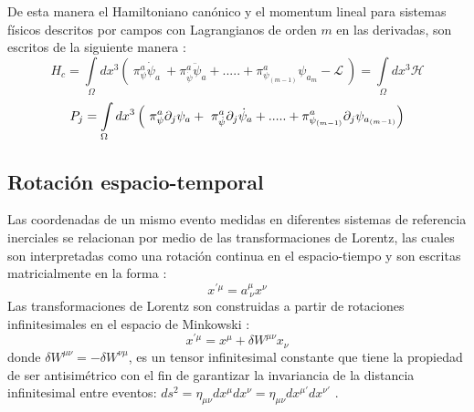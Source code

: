 \documentclass[a4paper,12pt]{article}
\begin{document}
De esta manera el Hamiltoniano canónico y el momentum lineal para sistemas físicos descritos por campos con Lagrangianos de orden $m$ en las derivadas, son escritos de la siguiente manera \cite{general, podolsky}:
\begin{equation}
H_c=\int\limits_{\Omega}dx^{3} \left(\ \pi^{a}_{\psi}  \dot\psi_a\ +\pi^{a}_{\dot\psi}  \ddot\psi_a+.....+\pi^{a}_{\psi_{(m-1)}}\psi_{a_m}-\mathscr{L}\ \right)=\int\limits_{\Omega}dx^{3}\mathscr{H} 
\label{hamil}
\end{equation}
\begin{equation}
P_{j}=\int\limits_{\Omega}dx^{3}\left( \ \pi^{a}_{\psi}\partial_j\psi_a +\ \pi^{a}_{\dot\psi}\partial_j\dot\psi_a+.....+\pi^{a}_{\psi_{(m-1)}}\partial_j\psi_{a_{(m-1)}}\ \\ \right) 
\label{momenli}
\end{equation}
\subsection{Rotación espacio-temporal}
Las coordenadas de un mismo evento medidas en diferentes sistemas de referencia inerciales se relacionan por medio de las transformaciones de Lorentz, las cuales son interpretadas como una rotación continua en el espacio-tiempo y son escritas matricialmente en la forma \cite{noether,rela}:
\begin{equation}
x^{'\mu}=a_{\ \nu}^{\mu}x^{\nu}
\label{lore}
\end{equation}
Las transformaciones de Lorentz son construidas a partir de rotaciones \mbox{infinitesimales} en el espacio de Minkowski \cite{noether, greiner}:
\begin{equation}
x^{'\mu}=x^{\mu}+\delta W^{\mu \nu}x_\nu
\end{equation}
donde $\delta W^{\mu \nu}=-\delta W^{\nu\mu} $, es un tensor infinitesimal constante que tiene la propiedad de ser antisimétrico \mbox{con} el fin de garantizar la invariancia de la distancia \mbox{infinitesimal} entre eventos: \mbox{$ds^2=\eta_{\mu \nu}dx^\mu dx^\nu=\eta_{\mu \nu}dx^{\mu'} dx^{\nu'}$} \cite{rela,greiner}.
\\
\end{document}
